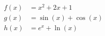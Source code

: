 
\begin{align}
    f(x) &= x^2 + 2x + 1 \label{eq:quadratica} \\
    g(x) &= \sin(x) + \cos(x) \label{eq:trigonometrica} \\
    h(x) &= e^x + \ln(x) \label{eq:exponencial}
\end{align}







